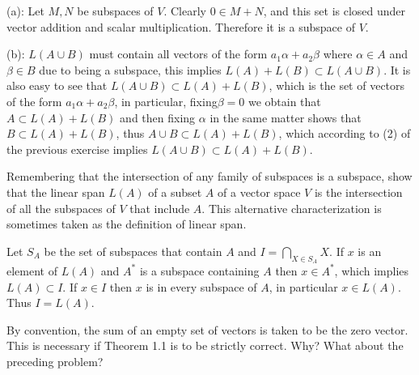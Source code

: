 \documentclass[../../main.tex]{subfiles}
\begin{document}
\begin{solution}
	(a): Let $M, N$ be subspaces of $V$. Clearly $0 \in M + N$, and this set is closed under vector addition and scalar multiplication. Therefore it is a subspace of $V$.
	\par
	(b): $L(A \cup B)$ must contain all vectors of the form $a_1\alpha + a_2\beta$ where $\alpha \in A$ and $\beta \in B$ due to being a subspace, this implies $L(A) + L(B) \subset L(A \cup B)$. It is also easy to see that $L(A \cup B) \subset L(A) + L(B)$, which is the set of vectors of the form $a_1 \alpha + a_2 \beta$, in particular, fixing$\beta = 0$ we obtain that $A \subset L(A) + L(B)$ and then fixing $\alpha$ in the same matter shows that $B \subset L(A) + L(B)$, thus $A \cup B \subset L(A) + L(B)$, which according to (2) of the previous exercise implies $L(A \cup B) \subset L(A) + L(B)$.
\end{solution}
\begin{problem}
	Remembering that the intersection of any family of subspaces is a subspace, show that the linear span $L(A)$ of a subset $A$ of a vector space $V$ is the intersection of all the subspaces of $V$ that include $A$. This alternative characterization is sometimes taken as the definition of linear span.
\end{problem}
\begin{solution}
	Let $S_A$ be the set of subspaces that contain $A$ and $I = \bigcap_{X \in S_A} X$.
	If $x$ is an element of $L(A)$ and $A^*$ is a subspace containing $A$ then $x \in A^*$, which implies $L(A) \subset I$. If $x \in I$ then $x$ is in every subspace of $A$, in particular $x \in L(A)$. Thus $I = L(A)$.
\end{solution}
\begin{problem}
By convention, the sum of an empty set of vectors is taken to be the zero vector. This is necessary if Theorem 1.1 is to be strictly correct. Why? What about the preceding problem?	
\end{problem}
\end{document}
